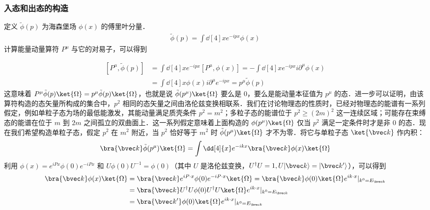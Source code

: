 
\subsubsection{入态和出态的构造}
定义 $\tilde{\phi}(p)$ 为海森堡场 $\phi(x)$ 的傅里叶分量．
\begin{equation}
\begin{aligned}
\tilde\phi(p)=\int \dd[4]{x} e^{-ipx} \phi(x)
\end{aligned}
\end{equation}
计算能量动量算符 $P^\mu$ 与它的对易子，可以得到

\begin{equation}
\begin{aligned}
[P^\mu, \tilde\phi(p)] &=\int \dd[4]{x} e^{-ipx} [P^\mu,\phi(x)]=-\int \dd[4]{x} e^{-ipx} i\partial^\mu \phi(x)\\
&=\int \dd[4]{x} \phi(x) i\partial^\mu e^{-ipx}=p^\mu \tilde\phi(p)
\end{aligned}
\end{equation}
这意味着 $P^\mu \tilde \phi(p)\ket{\Omega}=p^\mu \tilde{\phi}(p)\ket{\Omega}$，也就是说 $\tilde\phi (p^\mu) \ket{\Omega}$ 要么是 $0$，要么是能动量本征值为 $p^\mu$ 的态．进一步可以证明，由该算符构造的态矢量所构成的集合中，$p^2$ 相同的态矢量之间由洛伦兹变换相联系．我们在讨论物理态的性质时，已经对物理态的能谱有一系列假定，例如单粒子态为场的最低能激发，其能动量满足质壳条件 $p^2=m^2$；多粒子态的能谱位于 $p^2\ge (2m)^2$ 这一连续区域；可能存在束缚态的能谱在位于 $m$ 到 $2m$ 之间孤立的双曲面上．这一系列假定意味着上面构造的 $\phi(p^\mu)\ket{\Omega}$ 仅当 $p^2$ 满足一定条件时才是非 $0$ 的态．现在我们希望构造单粒子态，假定 $p^2$ 在 $m^2$ 附近，当 $p^2$ 恰好等于 $m^2$ 时 $\tilde{\phi}(p^\mu)\ket{\Omega}$ 才不为零．将它与单粒子态 $\ket{\bvec k}$ 作内积：
\[
\bra{\bvec k} \tilde\phi(p^\mu) \ket{\Omega}=\int \dd[4]{x} e^{-ikx}\bra{\bvec k}\phi(x)\ket{\Omega}
\]
利用 $\phi(x)=e^{iPx}\phi(0)e^{-iPx}$ 和 $U\phi(0)U^{-1}=\phi(0)$（其中 $U$ 是洛伦兹变换，$U^\dagger U=1,U |\bvec k\rangle = |\bvec k'\rangle$），可以得到
\begin{equation}\begin{aligned}
\bra{\bvec k}\phi(x)\ket{\Omega}&=
\bra{\bvec k}e^{iP\cdot x}\phi(0) e^{-i P\cdot x}\ket{\Omega} = \bra{\bvec k}\phi(0)\ket{\Omega} e^{ik\cdot x}|_{k^0=E_{\bvec k}} \\
&=\bra{\bvec k}U^\dagger U\phi(0)U^\dagger U\ket{\Omega} e^{ik\cdot x}|_{k^0=E_{\bvec k}}\\
&=\bra{\bvec k'}\phi(0)\ket{\Omega} e^{ik\cdot x}|_{k^0=E_{\bvec k}}
\end{aligned}\end{equation}
